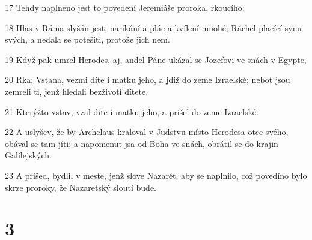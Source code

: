 \par 17 Tehdy naplneno jest to povedení Jeremiáše proroka, rkoucího:
\par 18 Hlas v Ráma slyšán jest, naríkání a plác a kvílení mnohé; Ráchel placící synu svých, a nedala se potešiti, protože jich není.
\par 19 Když pak umrel Herodes, aj, andel Páne ukázal se Jozefovi ve snách v Egypte,
\par 20 Rka: Vstana, vezmi díte i matku jeho, a jdiž do zeme Izraelské; nebot jsou zemreli ti, jenž hledali bezživotí dítete.
\par 21 Kterýžto vstav, vzal díte i matku jeho, a prišel do zeme Izraelské.
\par 22 A uslyšev, že by Archelaus kraloval v Judstvu místo Herodesa otce svého, obával se tam jíti; a napomenut jsa od Boha ve snách, obrátil se do krajin Galilejských.
\par 23 A prišed, bydlil v meste, jenž slove Nazarét, aby se naplnilo, což povedíno bylo skrze proroky, že Nazaretský slouti bude.

\chapter{3}

